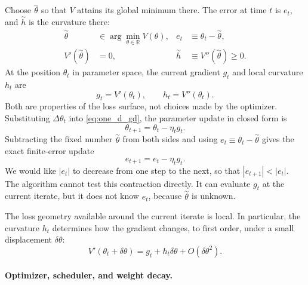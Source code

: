 \documentclass[11pt,letterpaper]{article}
\newcommand{\R}{\mathbb{R}}
\begin{document}
Choose $\overset{\sim}{\theta}$ so that $V$ attains its global minimum there.
The error at time $t$ is $e_t$, and $\overset{\sim}{h}$ is the curvature
there:
\begin{equation}
  \begin{aligned}
    \overset{\sim}{\theta}&\in\arg\min_{\theta\in\R}V(\theta),
    &e_t&\equiv\theta_t-\overset{\sim}{\theta},\\
    V'(\overset{\sim}{\theta})&=0,
    &\overset{\sim}{h}&\equiv V''(\overset{\sim}{\theta})\geq0.
  \end{aligned}
\end{equation}
At the position $\theta_t$ in parameter space, the current gradient $g_t$ and
local curvature $h_t$ are
\begin{equation}
  g_t=V'(\theta_t),
  \qquad
  h_t=V''(\theta_t).
\end{equation}
Both are properties of the loss surface, not choices made by the optimizer.
Substituting $\Delta\theta_t$ into \eqref{eq:one_d_gd}, the parameter update
in closed form is
\begin{equation}\label{eq:one_d_gd_closed}
  \theta_{t+1}=\theta_t-\eta_tg_t.
\end{equation}
Subtracting the fixed number $\overset{\sim}{\theta}$ from both sides and using
$e_t\equiv\theta_t-\overset{\sim}{\theta}$ gives the exact finite-error update
\begin{equation}\label{eq:error_update}
  e_{t+1}=e_t-\eta_tg_t.
\end{equation}
We would like $|e_t|$ to decrease from one step to the next, so that
$|e_{t+1}|<|e_t|$. The algorithm cannot test this contraction directly. It can
evaluate $g_t$ at the current iterate, but it does not know $e_t$, because
$\overset{\sim}{\theta}$ is unknown.

The loss geometry available around the current iterate is local. In particular,
the curvature $h_t$ determines how the gradient changes, to first order, under
a small displacement $\delta\theta$:
\[
  V'(\theta_t+\delta\theta)
  =g_t+h_t\delta\theta+O(\delta\theta^2).
\]

\paragraph{Optimizer, scheduler, and weight decay.}
\end{document}
